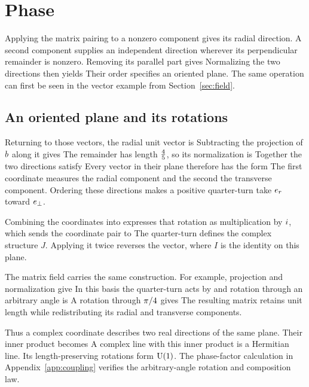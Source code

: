 \section{Phase}
\label{sec:phase}
Applying the matrix pairing to a nonzero component gives its radial direction. A second component supplies an independent direction wherever its perpendicular remainder is nonzero. Removing its parallel part gives
\PhaseTransverseDisplay
Normalizing the two directions then yields
\PhaseNormalizationDisplay
Their order specifies an oriented plane. The same operation can first be seen in the vector example from Section~\ref{sec:field}.

\subsection{An oriented plane and its rotations}
Returning to those vectors,
\FieldRadialVectorsDisplay
the radial unit vector is
\FieldRadialUnitDisplay
Subtracting the projection of $b$ along it gives
\FieldTransverseSubtractionDisplay
The remainder has length $\frac45$, so its normalization is
\FieldTransverseUnitDisplay
Together the two directions satisfy
\FieldPlaneOrthonormalityDisplay
Every vector in their plane therefore has the form
\FieldPlaneVectorDisplay
The first coordinate measures the radial component and the second the transverse component. Ordering these directions makes a positive quarter-turn take ${e_r}$ toward ${e_\perp}$.

Combining the coordinates into
\FieldPlaneComplexCoordinateDisplay
expresses that rotation as multiplication by $i$,
\FieldPlaneImaginaryRotationDisplay
which sends the coordinate pair to
\FieldPlaneQuarterTurnDisplay
The quarter-turn defines the complex structure $J$. Applying it twice reverses the vector,
\FieldPlaneComplexStructureDisplay
where $I$ is the identity on this plane.

The matrix field carries the same construction. For example,
\PhaseMatrixExampleDisplay
projection and normalization give
\PhaseMatrixProjectionDisplay
In this basis the quarter-turn acts by
\PhaseComplexStructureDisplay
and rotation through an arbitrary angle is
\PhaseRotationDisplay
A rotation through $\pi/4$ gives
\PhaseMatrixRotationDisplay
The resulting matrix retains unit length while redistributing its radial and transverse components.

Thus a complex coordinate describes two real directions of the same plane. Their inner product becomes
\PhaseHermitianExampleDisplay
A complex line with this inner product is a Hermitian line. Its length-preserving rotations form $\mathrm{U}(1)$. The phase-factor calculation in Appendix~\ref{app:coupling} verifies the arbitrary-angle rotation and composition law.

